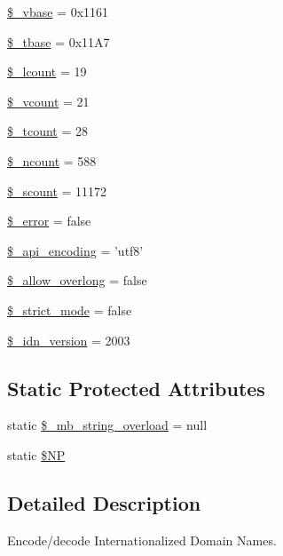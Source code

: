 \begin{DoxyCompactItemize}
\hyperlink{classidna__convert_a2e984a3fe1e2e4d5192dd9a5220e9c29}{\$\-\_\-vbase} = 0x1161
\item 
\hyperlink{classidna__convert_a5b728e6ff6e15773c914383a66651826}{\$\-\_\-tbase} = 0x11\-A7
\item 
\hyperlink{classidna__convert_ae191087842e21e5f56a0df02f922abbe}{\$\-\_\-lcount} = 19
\item 
\hyperlink{classidna__convert_afe217921aaa9aa954361f3aa090c69c1}{\$\-\_\-vcount} = 21
\item 
\hyperlink{classidna__convert_a81a70a95e18fde08ec6633f0095c92c6}{\$\-\_\-tcount} = 28
\item 
\hyperlink{classidna__convert_a0e6408f36ff8f150adb9d1a67c7fe3e2}{\$\-\_\-ncount} = 588
\item 
\hyperlink{classidna__convert_aa422586662f0878841bd8dcda663c058}{\$\-\_\-scount} = 11172
\item 
\hyperlink{classidna__convert_ae3825ac4f637ed992ef96f261647c396}{\$\-\_\-error} = false
\item 
\hyperlink{classidna__convert_abc9b2aaad4b02a40602f254ac44ab973}{\$\-\_\-api\-\_\-encoding} = 'utf8'
\item 
\hyperlink{classidna__convert_a7a40288feb2a5635c567a28710017e56}{\$\-\_\-allow\-\_\-overlong} = false
\item 
\hyperlink{classidna__convert_a6457ade57cb55c7b44bfbf8686c2c2d5}{\$\-\_\-strict\-\_\-mode} = false
\item 
\hyperlink{classidna__convert_a14edc7c94d7c9c05a8a7eada24901dfd}{\$\-\_\-idn\-\_\-version} = 2003
\end{DoxyCompactItemize}
\subsection*{Static Protected Attributes}
\begin{DoxyCompactItemize}
\item 
static \hyperlink{classidna__convert_a36aba0d7717782343396a25026107dc7}{\$\-\_\-mb\-\_\-string\-\_\-overload} = null
\item 
static \hyperlink{classidna__convert_a82881f4c426f3e6603e252c8bebc875f}{\$\-N\-P}
\end{DoxyCompactItemize}


\subsection{Detailed Description}
Encode/decode Internationalized Domain Names.

